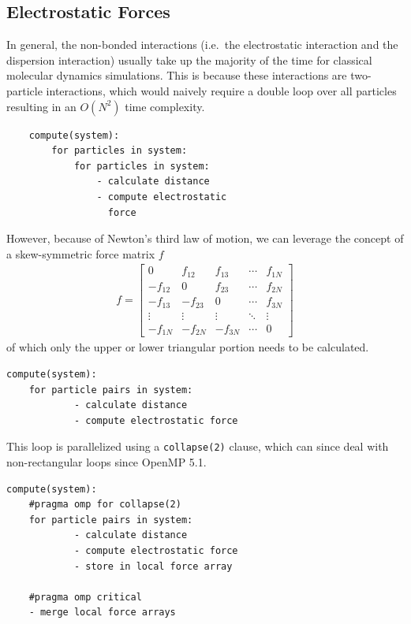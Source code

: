 \documentclass[conference]{IEEEtran}
\begin{document}
\subsection{Electrostatic Forces}
In general, the non-bonded interactions (i.e.\ the electrostatic interaction and the dispersion interaction) usually
take up the majority of the time for classical molecular dynamics simulations. This is because these interactions are
two-particle interactions, which would naively require a double loop over all particles resulting in an $O(N^2)$
time complexity. 
\begin{lstlisting}
    compute(system):
        for particles in system:
            for particles in system:
                - calculate distance
                - compute electrostatic 
                  force
    \end{lstlisting}


However, because of Newton's third law of motion, we can leverage the concept of a skew-symmetric 
force matrix $f$
\begin{align*}
        f =
        \begin{bmatrix}
        0 & f_{12} & f_{13} & \cdots & f_{1N} \\
        -f_{12} & 0 & f_{23} & \cdots & f_{2N} \\
        -f_{13} & -f_{23} & 0 & \cdots & f_{3N} \\
        \vdots & \vdots & \vdots & \ddots & \vdots \\
        -f_{1N} & -f_{2N} & -f_{3N} & \cdots & 0
        \end{bmatrix}  
\end{align*}
of which only the upper or lower triangular portion needs to be calculated.
\begin{lstlisting}
compute(system):
    for particle pairs in system:
            - calculate distance
            - compute electrostatic force
\end{lstlisting}

This loop is parallelized using a
\verb|collapse(2)| clause, which can since deal with non-rectangular loops since OpenMP 5.1.
\begin{lstlisting}
compute(system):
    #pragma omp for collapse(2)
    for particle pairs in system:
            - calculate distance
            - compute electrostatic force
            - store in local force array

    #pragma omp critical
    - merge local force arrays
\end{lstlisting}
\end{document}
